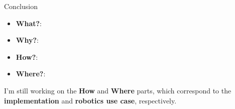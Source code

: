 \begin{frame}{Conclusion}
    \begin{itemize}
        \item \textbf{What?}: 
        \item \textbf{Why?}: 
        \item \textbf{How?}: 
        \item \textbf{Where?}: 
    \end{itemize}
    \vspace{1cm}
    I'm still working on the \textbf{How} and \textbf{Where} parts, which correspond to the 
    \textbf{implementation} and \textbf{robotics use case}, respectively.
\end{frame}
